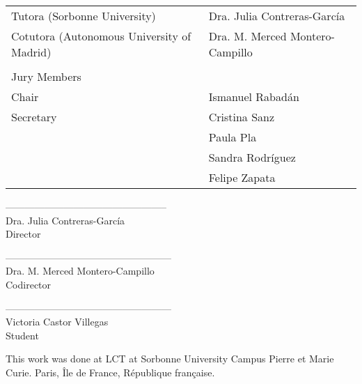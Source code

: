 \thispagestyle{empty}

\vspace{2cm}
\vspace{1cm}

\begin{tabular}{ll}
Tutora (Sorbonne University) & Dra. Julia Contreras-García\\
Cotutora (Autonomous University of Madrid) & Dra. M. Merced Montero-Campillo\\
 & \\
Jury Members & \\
Chair & Ismanuel Rabadán\\
Secretary & Cristina Sanz \\
 & Paula Pla \\
 & Sandra Rodríguez \\
 & Felipe Zapata 
\end{tabular}

\vspace{4cm}


\begin{multicols}{2}

\begin{center}
--------------------------------------------------\\
Dra. Julia Contreras-García \\
Director\\
\end{center}

\begin{center}
---------------------------------------------------\\
Dra. M. Merced Montero-Campillo\\
Codirector\\
\end{center}

\end{multicols}

\vspace{2cm}

\begin{center}
---------------------------------------------------\\
Victoria Castor Villegas\\
Student\\
\end{center}

\vspace{2cm}

\noindent
This work was done at LCT at Sorbonne University Campus Pierre et Marie Curie.
Paris, Île de France, République française.

